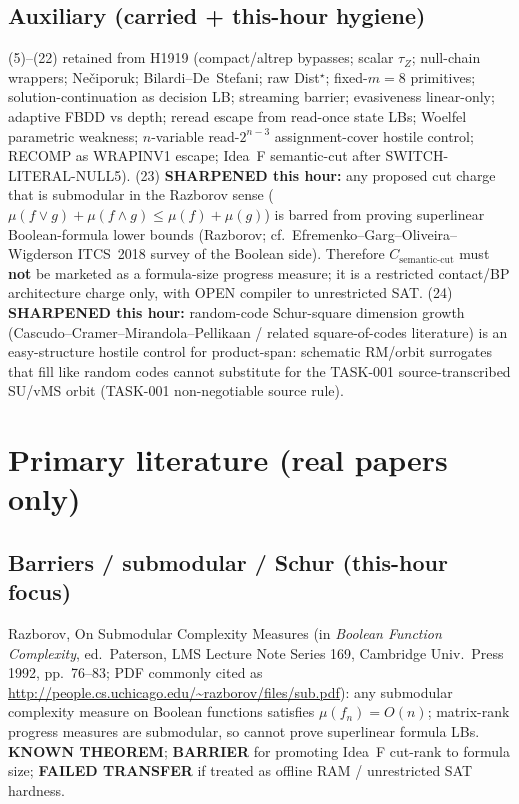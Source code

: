 \documentclass[11pt]{article}
\begin{document}
\subsection*{Auxiliary (carried + this-hour hygiene)}
(5)--(22) retained from H1919 (compact/altrep bypasses; scalar $\tau_Z$; null-chain wrappers;
Ne\v{c}iporuk; Bilardi--De~Stefani; raw Dist$^\star$; fixed-$m=8$ primitives; solution-continuation
as decision LB; streaming barrier; evasiveness linear-only; adaptive FBDD vs depth;
reread escape from read-once state LBs; Woelfel parametric weakness; $n$-variable
read-$2^{n-3}$ assignment-cover hostile control; RECOMP as WRAPINV1 escape; Idea~F
semantic-cut after SWITCH-LITERAL-NULL5).
(23) \textbf{SHARPENED this hour:} any proposed cut charge that is submodular in the
Razborov sense ($\mu(f\lor g)+\mu(f\land g)\le\mu(f)+\mu(g)$) is barred from proving
superlinear Boolean-formula lower bounds (Razborov; cf.\ Efremenko--Garg--Oliveira--Wigderson
ITCS~2018 survey of the Boolean side). Therefore $C_{\mathrm{semantic\textrm{-}cut}}$ must
\textbf{not} be marketed as a formula-size progress measure; it is a restricted contact/BP
architecture charge only, with OPEN compiler to unrestricted SAT.
(24) \textbf{SHARPENED this hour:} random-code Schur-square dimension growth
(Cascudo--Cramer--Mirandola--Pellikaan / related square-of-codes literature) is an easy-structure
hostile control for product-span: schematic RM/orbit surrogates that fill like random codes
cannot substitute for the TASK-001 source-transcribed SU/vMS orbit (TASK-001 non-negotiable
source rule).

\section*{Primary literature (real papers only)}
\subsection*{Barriers / submodular / Schur (this-hour focus)}
Razborov, On Submodular Complexity Measures
(in \emph{Boolean Function Complexity}, ed.\ Paterson, LMS Lecture Note Series 169,
Cambridge Univ.\ Press 1992, pp.~76--83; PDF commonly cited as
\url{http://people.cs.uchicago.edu/~razborov/files/sub.pdf}):
any submodular complexity measure on Boolean functions satisfies $\mu(f_n)=O(n)$;
matrix-rank progress measures are submodular, so cannot prove superlinear formula LBs.
\textbf{KNOWN THEOREM}; \textbf{BARRIER} for promoting Idea~F cut-rank to formula size;
\textbf{FAILED TRANSFER} if treated as offline RAM / unrestricted SAT hardness.
\end{document}
